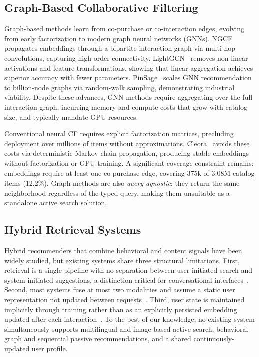 \subsection{Graph-Based Collaborative Filtering}
Graph-based methods learn from co-purchase or co-interaction edges, evolving
from early factorization to modern graph neural networks (GNNs).
NGCF~\cite{wang2019ngcf} propagates embeddings through a bipartite interaction
graph via multi-hop convolutions, capturing high-order connectivity.
LightGCN~\cite{he2020lightgcn} removes non-linear activations and feature
transformations, showing that linear aggregation achieves superior accuracy
with fewer parameters.
PinSage~\cite{ying2018pinsage} scales GNN recommendation to billion-node
graphs via random-walk sampling, demonstrating industrial viability.
Despite these advances, GNN methods require aggregating over the full
interaction graph, incurring memory and compute costs that grow with catalog
size, and typically mandate GPU resources.

Conventional neural CF requires explicit factorization matrices, precluding
deployment over millions of items without approximations.
Cleora~\cite{cleora2021} avoids these costs via deterministic Markov-chain
propagation, producing stable embeddings without factorization or GPU training.
A significant coverage constraint remains: embeddings require at least one
co-purchase edge, covering 375k of 3.08M catalog items (12.2\%).
Graph methods are also \emph{query-agnostic}: they return the same
neighborhood regardless of the typed query, making them unsuitable as a
standalone active search solution.

\subsection{Hybrid Retrieval Systems}
Hybrid recommenders that combine behavioral and content signals have been
widely studied, but existing systems share three structural limitations.
First, retrieval is a single pipeline with no separation between user-initiated
search and system-initiated suggestions, a distinction critical for
conversational interfaces~\cite{wang2019ngcf,he2020lightgcn}.
Second, most systems fuse at most two modalities and assume a static user
representation not updated between requests~\cite{radford2021clip,ying2018pinsage}.
Third, user state is maintained implicitly through training rather than as an
explicitly persisted embedding updated after each interaction~\cite{kang2018self,xie2022difsr}.
To the best of our knowledge, no existing system simultaneously supports multilingual and
image-based active search, behavioral-graph and sequential passive
recommendations, and a shared continuously-updated user profile.

